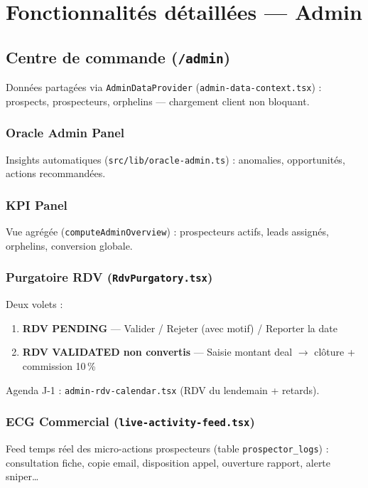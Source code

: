 \documentclass[11pt,a4paper]{report}
\begin{document}
\chapter{Fonctionnalités détaillées --- Admin}

\section{Centre de commande (\texttt{/admin})}

Données partagées via \texttt{AdminDataProvider} (\texttt{admin-data-context.tsx}) :
prospects, prospecteurs, orphelins --- chargement client non bloquant.

\subsection{Oracle Admin Panel}
Insights automatiques (\texttt{src/lib/oracle-admin.ts}) : anomalies, opportunités, actions recommandées.

\subsection{KPI Panel}
Vue agrégée (\texttt{computeAdminOverview}) : prospecteurs actifs, leads assignés, orphelins, conversion globale.

\subsection{Purgatoire RDV (\texttt{RdvPurgatory.tsx})}
Deux volets :
\begin{enumerate}
  \item \textbf{RDV PENDING} --- Valider / Rejeter (avec motif) / Reporter la date
  \item \textbf{RDV VALIDATED non convertis} --- Saisie montant deal $\rightarrow$ clôture + commission 10\,\%
\end{enumerate}
Agenda J-1 : \texttt{admin-rdv-calendar.tsx} (RDV du lendemain + retards).

\subsection{ECG Commercial (\texttt{live-activity-feed.tsx})}
Feed temps réel des micro-actions prospecteurs (table \texttt{prospector\_logs}) :
consultation fiche, copie email, disposition appel, ouverture rapport, alerte sniper\ldots
\end{document}
